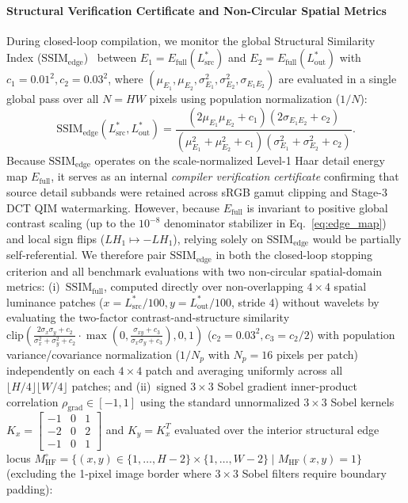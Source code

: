 \documentclass[conference,10pt]{IEEEtran}
\begin{document}
\paragraph{Structural Verification Certificate and Non-Circular Spatial Metrics}
During closed-loop compilation, we monitor the global Structural Similarity Index ($\mathrm{SSIM}_{\text{edge}}$)~\cite{wang2004} between $E_1 = E_{\text{full}}(L^*_{\text{src}})$ and $E_2 = E_{\text{full}}(L^*_{\text{out}})$ with $c_1 = 0.01^2, c_2 = 0.03^2$, where $(\mu_{E_1}, \mu_{E_2}, \sigma_{E_1}^2, \sigma_{E_2}^2, \sigma_{E_1 E_2})$ are evaluated in a single global pass over all $N = HW$ pixels using population normalization ($1/N$):
\begin{equation}
\label{eq:ssim_edge}
\mathrm{SSIM}_{\text{edge}}(L^*_{\text{src}}, L^*_{\text{out}}) = \frac{(2\mu_{E_1}\mu_{E_2} + c_1)(2\sigma_{E_1 E_2} + c_2)}{(\mu_{E_1}^2 + \mu_{E_2}^2 + c_1)(\sigma_{E_1}^2 + \sigma_{E_2}^2 + c_2)}.
\end{equation}
Because $\mathrm{SSIM}_{\text{edge}}$ operates on the scale-normalized Level-1 Haar detail energy map $E_{\text{full}}$, it serves as an internal \emph{compiler verification certificate} confirming that source detail subbands were retained across sRGB gamut clipping and Stage-3 DCT QIM watermarking. However, because $E_{\text{full}}$ is invariant to positive global contrast scaling (up to the $10^{-8}$ denominator stabilizer in Eq.~\ref{eq:edge_map}) and local sign flips ($LH_1 \mapsto -LH_1$), relying solely on $\mathrm{SSIM}_{\text{edge}}$ would be partially self-referential. We therefore pair $\mathrm{SSIM}_{\text{edge}}$ in both the closed-loop stopping criterion and all benchmark evaluations with two non-circular spatial-domain metrics: (i)~$\mathrm{SSIM}_{\text{full}}$, computed directly over non-overlapping $4\times 4$ spatial luminance patches ($x = L^*_{\text{src}}/100, y = L^*_{\text{out}}/100$, stride $4$) without wavelets by evaluating the two-factor contrast-and-structure similarity $\mathrm{clip}\!\left(\frac{2\sigma_x \sigma_y + c_2}{\sigma_x^2 + \sigma_y^2 + c_2} \cdot \max\!\left(0, \frac{\sigma_{xy} + c_3}{\sigma_x \sigma_y + c_3}\right), 0, 1\right)$ ($c_2 = 0.03^2, c_3 = c_2/2$) with population variance/covariance normalization ($1/N_p$ with $N_p = 16$ pixels per patch) independently on each $4\times 4$ patch and averaging uniformly across all $\lfloor H/4 \rfloor \lfloor W/4 \rfloor$ patches; and (ii)~signed $3\times 3$ Sobel gradient inner-product correlation $\rho_{\text{grad}} \in [-1, 1]$ using the standard unnormalized $3\times 3$ Sobel kernels $K_x = \left[\begin{smallmatrix} -1 & 0 & 1 \\ -2 & 0 & 2 \\ -1 & 0 & 1 \end{smallmatrix}\right]$ and $K_y = K_x^T$ evaluated over the interior structural edge locus $M_{\text{HF}}^\circ = \{(x,y) \in \{1,\dots,H-2\}\times\{1,\dots,W-2\} \mid M_{\text{HF}}(x,y) = 1\}$ (excluding the 1-pixel image border where $3\times 3$ Sobel filters require boundary padding):
\end{document}
